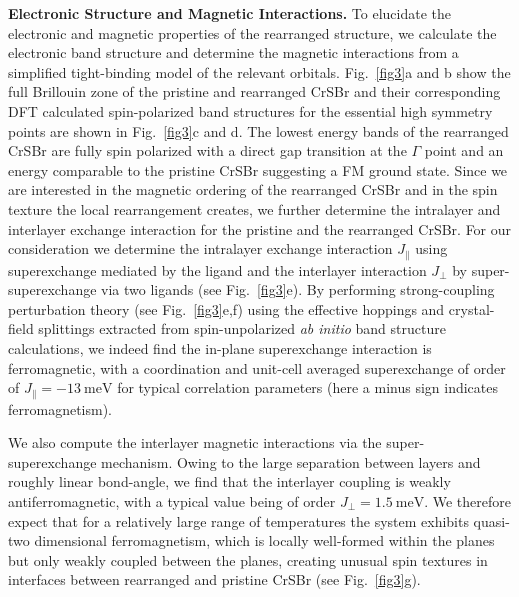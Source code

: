 \documentclass[aps,prl,showpacs,twocolumn,superscriptaddress,floatfix]{revtex4-2}
\begin{document}
\textbf{Electronic Structure and Magnetic Interactions.} To elucidate the electronic and magnetic properties of the rearranged structure, we calculate the electronic band structure and determine the magnetic interactions from a simplified tight-binding model of the relevant orbitals. Fig.~\ref{fig3}a and b show the full Brillouin zone of the pristine and rearranged CrSBr and their corresponding DFT calculated spin-polarized band structures for the essential high symmetry points are shown in Fig.~\ref{fig3}c and d. The lowest energy bands of the rearranged CrSBr are fully spin polarized with a direct gap transition at the $\Gamma$ point and an energy comparable to the pristine CrSBr suggesting a FM ground state. Since we are interested in the magnetic ordering of the rearranged CrSBr and in the spin texture the local rearrangement creates, we further determine the intralayer and interlayer exchange interaction for the pristine and the rearranged CrSBr. For our consideration we determine the intralayer exchange interaction $J_{\parallel}$ using superexchange mediated by the ligand and the interlayer interaction $J_{\perp}$ by super-superexchange via two ligands (see Fig.~\ref{fig3}e).
By performing strong-coupling perturbation theory (see Fig.~\ref{fig3}e,f) using the effective hoppings and crystal-field splittings extracted from spin-unpolarized {\it ab initio} band structure calculations, we indeed find the in-plane superexchange interaction is ferromagnetic, with a coordination and unit-cell averaged superexchange of order of $J_{\parallel} = -\SI{13}{\meV}$ for typical correlation parameters (here a minus sign indicates ferromagnetism).  

We also compute the interlayer magnetic interactions via the super-superexchange mechanism. Owing to the large separation between layers and roughly linear bond-angle, we find that the interlayer coupling is weakly antiferromagnetic, with a typical value being of order $J_{\perp} = \SI{1.5}{\meV}$. We therefore expect that for a relatively large range of temperatures the system exhibits quasi-two dimensional ferromagnetism, which is locally well-formed within the planes but only weakly coupled between the planes, creating unusual spin textures in interfaces between rearranged and pristine CrSBr (see Fig.~\ref{fig3}g). 
\end{document}
